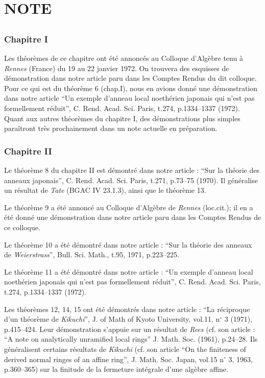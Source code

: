 \chapter*{NOTE}\thispagestyle{empty}
\label{sec:n1}
\section*{}

\subsection*{Chapitre I}

Les théorèmes de ce chapitre ont été annoncés au Colloque d’Algèbre tenu à \emph{Rennes} (France) du 19 au 22 janvier 1972. On trouvera des esquisses de démonstration dans notre article paru dans les Comptes Rendus du dit colloque. Pour ce qui est du théorème 6 (chap.I), nous en avions donné une démonstration dans notre article ``Un exemple d’anneau local noethérien japonais qui n’est pas formellement réduit'', C. Rend. Acad. Sci. Paris, t.274, p.1334--1337 (1972). Quant aux autres théorèmes du chapitre I, des démonstrations plus simples paraîtront très prochainement dans un note actuelle en préparation.

\subsection*{Chapitre II}

Le théorème 8 du chapitre II est démontré dans notre article : ``Sur la théorie des anneaux japonais'', C. Rend. Acad. Sci. Paris, t.271, p.73--75 (1970). Il généralise un résultat de \emph{Tate} (BGAC IV 23.1.3), ainsi que le théorème 13.

Le théorème 9 a été annoncé au Colloque d’Algèbre de \emph{Rennes} (loc.cit.); il en a été donné une démonstration dans notre article paru dans les Comptes Rendus de ce colloque.

Le théorème 10 a été démontré dans notre article : ``Sur la théorie des anneaux de \emph{Weierstrass}'', Bull. Sci. Math., t.95, 1971, p.223--225.

Le théorème 11 a été démontré dans notre article : ``Un exemple d’anneau local noethérien japonais qui n’est pas formellement réduit'', C. Rend. Acad. Sci. Paris, t.274, p.1334--1337 (1972).

Les théorèmes 12, 14, 15 ont été démontrés dans notre article : ``La réciproque d’un théorème de \emph{Kikuchi}'', J. of Math of Kyoto University, vol.11, n$^\circ$ 3 (1971), p.415--424. Leur démonstration s’appuie sur un résultat de \emph{Rees} (cf. son article : ``A note on analytically unramified local rings'' J. Math. Soc. (1961), p.24--28. Ils généralisent certains résultats de \emph{Kikuchi} (cf. son article ``On the finiteness of derived normal ringes of an affine ring'', J. Math. Soc. Japan, vol.15 n$^\circ$ 3, 1963, p.360--365) sur la finitude de la fermeture intégrale d’une algèbre affine.

